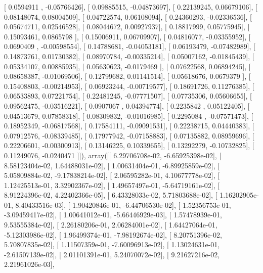 \documentclass{article}
\begin{document}
       [ 0.0594911 , -0.05766426],
       [ 0.09885515, -0.04873697],
       [ 0.22139245,  0.06679106],
       [ 0.08148074,  0.08004509],
       [ 0.04722574,  0.06108094],
       [ 0.24360293, -0.02336536],
       [ 0.05674711,  0.02546528],
       [ 0.08044672,  0.00927937],
       [ 0.18817999,  0.05775945],
       [ 0.15093461,  0.0865798 ],
       [ 0.15006911,  0.06709907],
       [ 0.04816077, -0.03355952],
       [ 0.0690409 , -0.00598554],
       [ 0.14788681, -0.04053181],
       [ 0.06193479, -0.07482989],
       [ 0.14873761,  0.01730382],
       [ 0.08970784, -0.00335214],
       [ 0.05007162, -0.01845439],
       [ 0.05334107,  0.00885935],
       [ 0.05630623, -0.0179469 ],
       [ 0.07622568,  0.06894245],
       [ 0.08658387, -0.01069506],
       [ 0.12799682,  0.01141514],
       [ 0.05618676,  0.0679379 ],
       [ 0.15408803, -0.00214953],
       [ 0.06923244, -0.00719577],
       [ 0.18691726,  0.11276385],
       [ 0.06533893,  0.07221754],
       [ 0.22481245, -0.07771507],
       [ 0.07735306,  0.05606655],
       [ 0.09562475, -0.03516221],
       [ 0.0907067 ,  0.04394774],
       [ 0.2235842 ,  0.05122405],
       [ 0.04513679,  0.07858318],
       [ 0.08309832, -0.01016985],
       [ 0.2295084 , -0.07571473],
       [ 0.18952349, -0.06817568],
       [ 0.17584111, -0.09091531],
       [ 0.22238715,  0.04440383],
       [ 0.07912576, -0.08339485],
       [ 0.17977942, -0.07158883],
       [ 0.07135882,  0.08959696],
       [ 0.22206601, -0.00300913],
       [ 0.13146225,  0.10339655],
       [ 0.13292279, -0.10732825],
       [ 0.11249076, -0.0240471 ]]), array([[  6.29706708e-02,  -6.65925398e-02],
       [  8.58123404e-02,   1.64488031e-02],
       [  1.00631404e-01,  -6.89925859e-02],
       [  5.05809884e-02,  -9.17838214e-02],
       [  2.06595282e-01,   4.10677778e-02],
       [  1.12425513e-01,   3.32902367e-02],
       [  1.49657497e-01,  -5.64719161e-02],
       [  8.91224396e-02,   4.22402366e-05],
       [  6.43328033e-02,   5.71803688e-02],
       [  1.16202905e-01,   8.40433516e-03],
       [  1.90420846e-01,  -6.44706530e-02],
       [  1.52356753e-01,  -3.09459417e-02],
       [  1.00641012e-01,  -5.66446929e-03],
       [  1.57478939e-01,   9.53555384e-02],
       [  2.26180206e-01,   2.06284001e-02],
       [  1.64427064e-01,  -5.12303986e-02],
       [  1.96499374e-01,  -7.98192674e-02],
       [  8.20751396e-02,   5.70807835e-02],
       [  1.11507359e-01,  -7.60096913e-02],
       [  1.13024631e-01,  -2.61507139e-02],
       [  2.01101391e-01,   5.24070072e-02],
       [  9.21627216e-02,   2.21961026e-03],
\end{document}
